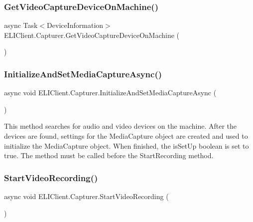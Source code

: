 \subsubsection{\texorpdfstring{Get\+Video\+Capture\+Device\+On\+Machine()}{GetVideoCaptureDeviceOnMachine()}}
{\footnotesize\ttfamily async Task$<$Device\+Information$>$ E\+L\+I\+Client.\+Capturer.\+Get\+Video\+Capture\+Device\+On\+Machine (\begin{DoxyParamCaption}{ }\end{DoxyParamCaption})\hspace{0.3cm}{\ttfamily [inline]}}

\mbox{\label{class_e_l_i_client_1_1_capturer_a5e64d7010dccca9d81ce8e758372a663}} 
\subsubsection{\texorpdfstring{Initialize\+And\+Set\+Media\+Capture\+Async()}{InitializeAndSetMediaCaptureAsync()}}
{\footnotesize\ttfamily async void E\+L\+I\+Client.\+Capturer.\+Initialize\+And\+Set\+Media\+Capture\+Async (\begin{DoxyParamCaption}{ }\end{DoxyParamCaption})\hspace{0.3cm}{\ttfamily [inline]}}



This method searches for audio and video devices on the machine. After the devices are found, settings for the Media\+Capture object are created and used to initialize the Media\+Capture object. When finished, the is\+Set\+Up boolean is set to true. The method must be called before the Start\+Recording method. 

\mbox{\label{class_e_l_i_client_1_1_capturer_a319a1f370fec226ad47ba982812535af}} 
\subsubsection{\texorpdfstring{Start\+Video\+Recording()}{StartVideoRecording()}}
{\footnotesize\ttfamily async void E\+L\+I\+Client.\+Capturer.\+Start\+Video\+Recording (\begin{DoxyParamCaption}{ }\end{DoxyParamCaption})\hspace{0.3cm}{\ttfamily [inline]}}

